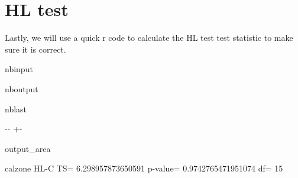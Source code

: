 \documentclass[letterpaper,10pt,english]{sphinxmanual}
\begin{document}
\section{HL test}
\label{\detokenize{notebooks/validation:HL-test}}
\sphinxAtStartPar
Lastly, we will use a quick r code to calculate the HL test test statistic to make sure it is correct.

\begin{sphinxuseclass}{nbinput}
{
\begin{sphinxVerbatim}[commandchars=\\\{\}]
\llap{\color{nbsphinxin}[51]:\,\hspace{\fboxrule}\hspace{\fboxsep}}
\PYG{p}{[}\PYG{p}{]}\PYG{p}{[}\PYG{p}{]}\PYG{p}{[}\PYG{p}{]}
\end{sphinxVerbatim}
}

\end{sphinxuseclass}
\begin{sphinxuseclass}{nboutput}
\begin{sphinxuseclass}{nblast}
{

\kern-\sphinxverbatimsmallskipamount\kern-\baselineskip
\kern+\FrameHeightAdjust\kern-\fboxrule
\vspace{\nbsphinxcodecellspacing}

\begin{sphinxuseclass}{output_area}
\begin{sphinxuseclass}{}


\begin{sphinxVerbatim}[commandchars=\\\{\}]
calzone HL-C TS= 6.298957873650591 p-value= 0.9742765471951074 df= 15
\end{sphinxVerbatim}



\end{sphinxuseclass}
\end{sphinxuseclass}
}

\end{sphinxuseclass}
\end{sphinxuseclass}
\end{document}

